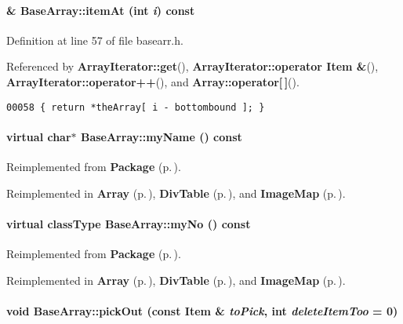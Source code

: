 \paragraph{ \& Base\-Array::item\-At (int {\em i}) const\hspace{0.3cm}{\tt  [inline, protected]}}\hfill



Definition at line 57 of file basearr.h.

Referenced by {\bf Array\-Iterator::get}(), {\bf Array\-Iterator::operator Item \&}(), {\bf Array\-Iterator::operator++}(), and {\bf Array::operator[$\,$]}().\small\begin{verbatim}00058 { return *theArray[ i - bottombound ]; }
\end{verbatim}\normalsize 
\label{BaseArray_a11}
\paragraph{\setlength{\rightskip}{0pt plus 5cm}virtual char$\ast$ Base\-Array::my\-Name () const\hspace{0.3cm}{\tt  [pure virtual]}}\hfill



Reimplemented from {\bf Package} {\rm (p.\,\pageref{Package_a9})}.

Reimplemented in {\bf Array} {\rm (p.\,\pageref{Array_a6})}, {\bf Div\-Table} {\rm (p.\,\pageref{DivTable_a3})}, and {\bf Image\-Map} {\rm (p.\,\pageref{ImageMap_a3})}.\label{BaseArray_a10}
\paragraph{\setlength{\rightskip}{0pt plus 5cm}virtual {\bf class\-Type} Base\-Array::my\-No () const\hspace{0.3cm}{\tt  [pure virtual]}}\hfill



Reimplemented from {\bf Package} {\rm (p.\,\pageref{Package_a8})}.

Reimplemented in {\bf Array} {\rm (p.\,\pageref{Array_a5})}, {\bf Div\-Table} {\rm (p.\,\pageref{DivTable_a2})}, and {\bf Image\-Map} {\rm (p.\,\pageref{ImageMap_a2})}.\label{BaseArray_a9}
\paragraph{\setlength{\rightskip}{0pt plus 5cm}void Base\-Array::pick\-Out (const {\bf Item} \& {\em to\-Pick}, int {\em delete\-Item\-Too} = 0)\hspace{0.3cm}{\tt  [virtual]}}\hfill



